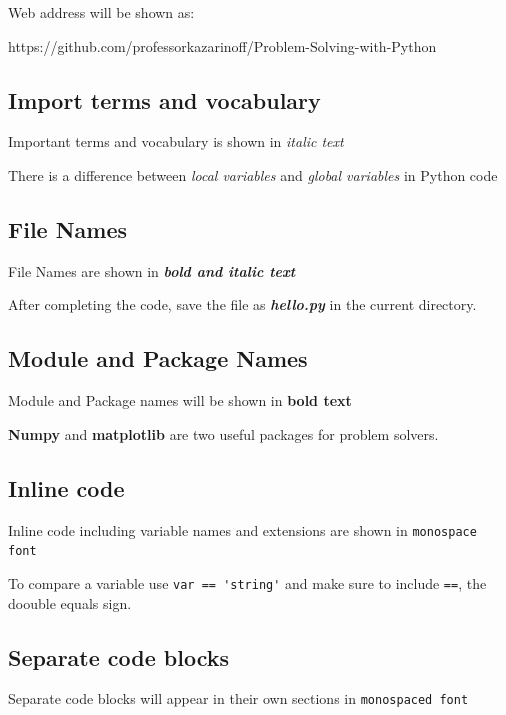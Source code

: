 \documentclass{book}
\begin{document}
Web address will be shown as:

https://github.com/professorkazarinoff/Problem-Solving-with-Python

    \subsection{Import terms and
vocabulary}\label{import-terms-and-vocabulary}

Important terms and vocabulary is shown in \emph{italic text}

There is a difference between \emph{local variables} and \emph{global
variables} in Python code

    \subsection{File Names}\label{file-names}

File Names are shown in \textbf{\emph{bold and italic text}}

After completing the code, save the file as \textbf{\emph{hello.py}} in
the current directory.

    \subsection{Module and Package Names}\label{module-and-package-names}

Module and Package names will be shown in \textbf{bold text}

\textbf{Numpy} and \textbf{matplotlib} are two useful packages for
problem solvers.

    \subsection{Inline code}\label{inline-code}

Inline code including variable names and extensions are shown in
\lstinline!monospace font!

To compare a variable use \lstinline!var == 'string'! and make sure to
include \lstinline!==!, the doouble equals sign.

    \subsection{Separate code blocks}\label{separate-code-blocks}

Separate code blocks will appear in their own sections in
\lstinline!monospaced font!
\end{document}
